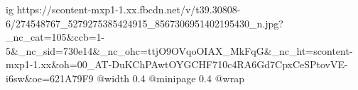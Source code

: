  
 
 
 
 

\ifcmt
  ig https://scontent-mxp1-1.xx.fbcdn.net/v/t39.30808-6/274548767_5279275385424915_8567306951402195430_n.jpg?_nc_cat=105&ccb=1-5&_nc_sid=730e14&_nc_ohc=ttjO9OVqoOIAX_MkFqG&_nc_ht=scontent-mxp1-1.xx&oh=00_AT-DuKChPAwtOYGCHF710c4RA6Gd7CpxCeSPtovVE-i6sw&oe=621A79F9
  @width 0.4
  @minipage 0.4
  @wrap \parpic[r]
\fi
